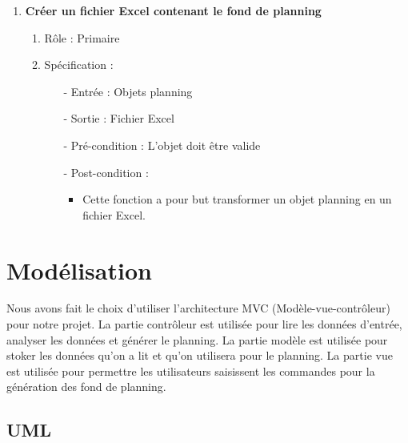 \documentclass{polytech/polytech}
\begin{document}
\begin{enumerate}
		\item \textbf{Créer un fichier Excel contenant le fond de planning}
		\begin{enumerate}
			\item Rôle :  Primaire
			\item Spécification :
			\begin{itemize}
				\item[-] Entrée : Objets planning
				\item[-] Sortie : Fichier Excel
				\item[-] Pré-condition : L'objet doit être valide
				\item[-] Post-condition :
				\begin{itemize}[label=\textbullet, font=\LARGE]
					\item Cette fonction a pour but transformer un objet planning en un fichier Excel.
				\end{itemize}
			\end{itemize}
		\end{enumerate}
	\end{enumerate}

	\section{Modélisation}

	Nous avons fait le choix d'utiliser l'architecture MVC (Modèle-vue-contrôleur) pour notre projet.
	La partie contrôleur est utilisée pour lire les données d'entrée, analyser les données et générer le planning.
	La partie modèle est utilisée pour stoker les données qu'on a lit et qu'on utilisera pour le planning.
	La partie vue est utilisée pour permettre les utilisateurs saisissent les commandes pour la génération des fond de planning.

	\pagebreak

	\subsection{UML}
\end{document}
